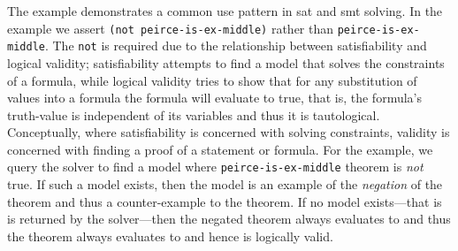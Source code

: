 The example demonstrates a common use pattern in \ac{sat} and \ac{smt} solving.
In the example we assert \lstinline{(not peirce-is-ex-middle)} rather than
\lstinline{peirce-is-ex-middle}. The \lstinline{not} is required due to the
relationship between satisfiability and logical validity; satisfiability
attempts to find a model that solves the constraints of a formula, while logical
validity tries to show that for any substitution of values into a formula the
formula will evaluate to true, that is, the formula's truth-value is independent
of its variables and thus it is tautological. Conceptually, where satisfiability
is concerned with solving constraints, validity is concerned with finding a
proof of a statement or formula. For the example, we query the solver to find a
model where \lstinline{peirce-is-ex-middle} theorem is \emph{not} true. If such
a model exists, then the model is an example of the \emph{negation} of the
theorem and thus a counter-example to the theorem. If no model exists---that is
 is returned by the solver---then the negated theorem always evaluates
to \fls{} and thus the theorem always evaluates to \tru{} and hence is logically
valid.

%

